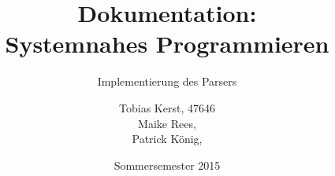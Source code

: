 \documentclass[a4paper,titlepage,12pt]{scrreprt}
\begin{document}
\titlehead{
	\texttt{[image: hska\_logo]}
}

\title{Dokumentation: \\ Systemnahes Programmieren}
\subtitle{Implementierung des Parsers}
\author{%
	Tobias Kerst, 47646 \\
	Maike Rees,  \\
	Patrick König, 
}
\date{Sommersemester 2015}
\publishers{
    \textbf{Dozent:} Prof.\,Dr. Fuchß
}
\maketitle

\clearpage
\end{document}
